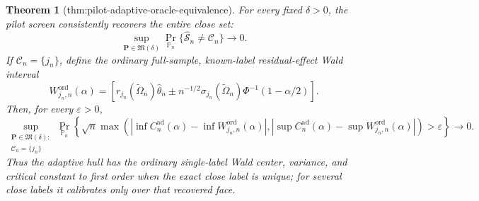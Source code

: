 \documentclass{article}
\newtheorem{theorem}{Theorem}
\begin{document}
\begin{theorem}[thm:pilot-adaptive-oracle-equivalence]\label{thm:pilot-adaptive-oracle-equivalence}
For every fixed \(\delta>0\), the pilot screen consistently recovers the entire close set:
\[
 \sup_{\mathbf P\in\mathfrak M(\delta)}
 \Pr_{\mathbb P_n}\{\widehat{\mathcal S}_n\ne\mathcal C_n\}
 \longrightarrow0.
\]
If \(\mathcal C_n=\{j_n\}\), define the ordinary full-sample, known-label residual-effect Wald interval
\[
 W_{j_n,n}^{\mathrm{ord}}(\alpha)
 =\left[
 r_{j_n}(\widetilde\Omega_n)\widehat\theta_n
 \mathbin{\pm}n^{-1/2}\sigma_{j_n}(\widetilde\Omega_n)
 \Phi^{-1}(1-\alpha/2)
 \right].
\]
Then, for every \(\varepsilon>0\),
\[
 \sup_{\substack{\mathbf P\in\mathfrak M(\delta):\\
                   \mathcal C_n=\{j_n\}}}
 \Pr_{\mathbb P_n}\!\left\{
 \sqrt n\max\left(
  \left|\inf C_n^{\mathrm{ad}}(\alpha)-\inf W_{j_n,n}^{\mathrm{ord}}(\alpha)\right|,
  \left|\sup C_n^{\mathrm{ad}}(\alpha)-\sup W_{j_n,n}^{\mathrm{ord}}(\alpha)\right|
 \right)>\varepsilon
 \right\}\longrightarrow0.
\]
Thus the adaptive hull has the ordinary single-label Wald center, variance, and critical constant to first order when the exact close label is unique; for several close labels it calibrates only over that recovered face.
\end{theorem}
\end{document}
